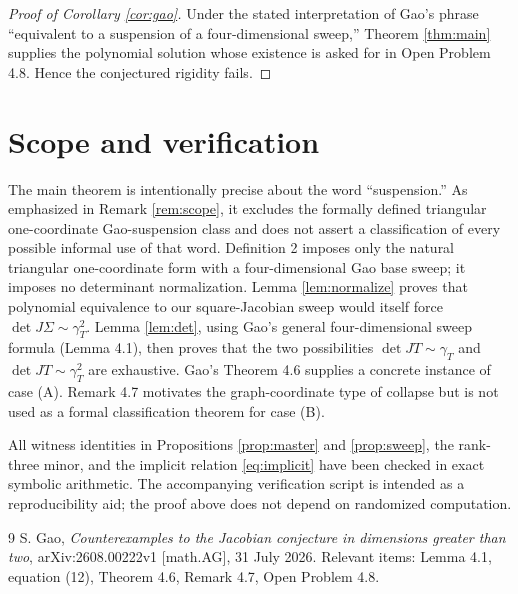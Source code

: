 \documentclass[11pt]{article}
\theoremstyle{definition}
\begin{document}
\begin{proof}[Proof of Corollary \ref{cor:gao}]
Under the stated interpretation of Gao's phrase ``equivalent to a suspension of a four-dimensional sweep,'' Theorem \ref{thm:main} supplies the polynomial solution whose existence is asked for in Open Problem 4.8. Hence the conjectured rigidity fails.
\end{proof}

\section{Scope and verification}

The main theorem is intentionally precise about the word ``suspension.''  As emphasized in Remark \ref{rem:scope}, it excludes the formally defined triangular one-coordinate Gao-suspension class and does not assert a classification of every possible informal use of that word. Definition 2 imposes only the natural triangular one-coordinate form with a four-dimensional Gao base sweep; it imposes no determinant normalization. Lemma \ref{lem:normalize} proves that polynomial equivalence to our square-Jacobian sweep would itself force $\det J\Sigma\sim\gamma_T^2$. Lemma \ref{lem:det}, using Gao's general four-dimensional sweep formula (Lemma 4.1), then proves that the two possibilities $\det JT\sim\gamma_T$ and $\det JT\sim\gamma_T^2$ are exhaustive. Gao's Theorem 4.6 supplies a concrete instance of case (A). Remark 4.7 motivates the graph-coordinate type of collapse but is not used as a formal classification theorem for case (B).

All witness identities in Propositions \ref{prop:master} and \ref{prop:sweep}, the rank-three minor, and the implicit relation \eqref{eq:implicit} have been checked in exact symbolic arithmetic. The accompanying verification script is intended as a reproducibility aid; the proof above does not depend on randomized computation.

\begin{thebibliography}{9}
S. Gao,
\emph{Counterexamples to the Jacobian conjecture in dimensions greater than two},
arXiv:2608.00222v1 [math.AG], 31 July 2026.
Relevant items: Lemma 4.1, equation (12), Theorem 4.6, Remark 4.7, Open Problem 4.8.
\end{thebibliography}
\end{document}
